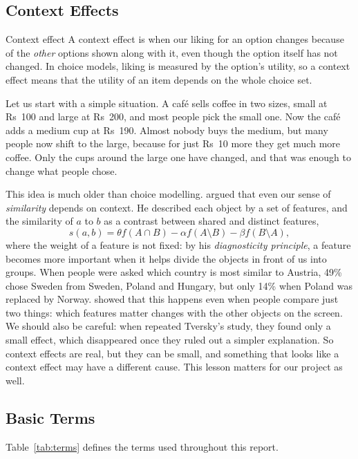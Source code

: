 \documentclass[11pt,a4paper]{article}
\numberwithin{table}{section}
\numberwithin{figure}{section}
\numberwithin{equation}{section}
\begin{document}
\subsection{Context Effects}
\begin{defbox}{Context effect}
A context effect is when our liking for an option changes because of the \emph{other} options shown along with it, even though the option itself has not changed. In choice models, liking is measured by the option's utility, so a context effect means that the utility of an item depends on the whole choice set.
\end{defbox}

Let us start with a simple situation. A caf\'e sells coffee in two sizes, small at Rs~100 and large at Rs~200, and most people pick the small one. Now the caf\'e adds a medium cup at Rs~190. Almost nobody buys the medium, but many people now shift to the large, because for just Rs~10 more they get much more coffee. Only the cups around the large one have changed, and that was enough to change what people chose.

This idea is much older than choice modelling. \citet{tversky1977} argued that even our sense of \emph{similarity} depends on context. He described each object by a set of features, and the similarity of $a$ to $b$ as a contrast between shared and distinct features,
\begin{equation}
s(a,b)=\theta f(A\cap B)-\alpha f(A\setminus B)-\beta f(B\setminus A),
\end{equation}
where the weight of a feature is not fixed: by his \emph{diagnosticity principle}, a feature becomes more important when it helps divide the objects in front of us into groups. When people were asked which country is most similar to Austria, 49\% chose Sweden from Sweden, Poland and Hungary, but only 14\% when Poland was replaced by Norway. \citet{goldstone1997} showed that this happens even when people compare just two things: which features matter changes with the other objects on the screen. We should also be careful: when \citet{evers2014} repeated Tversky's study, they found only a small effect, which disappeared once they ruled out a simpler explanation. So context effects are real, but they can be small, and something that looks like a context effect may have a different cause. This lesson matters for our project as well.

\subsection{Basic Terms}
Table~\ref{tab:terms} defines the terms used throughout this report.
\end{document}
